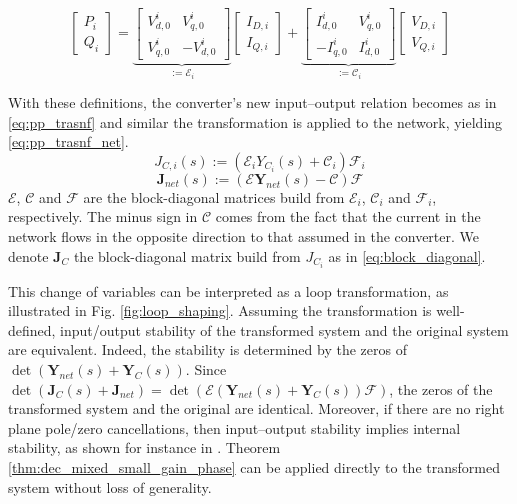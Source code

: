 \begin{equation}
    \begin{bmatrix}
        P_i \\ Q_i
    \end{bmatrix} = \underbrace{\begin{bmatrix}
        V^i_{d,0} & V^i_{q,0}  \\
        V^i_{q,0} & -V^i_{d,0}
    \end{bmatrix}}_{:=\mathcal{E}_i} \begin{bmatrix}
        I_{D,i} \\ I_{Q,i} 
    \end{bmatrix} + 
    \underbrace{\begin{bmatrix}
        I^i_{d,0} & V^i_{q,0}  \\
        -I^i_{q,0} & I^i_{d,0}
    \end{bmatrix}}_{:=\mathcal{C}_i}
    \begin{bmatrix}
        V_{D,i} \\ V_{Q,i} 
    \end{bmatrix}
    \label{eq:change_of_coord_2}
\end{equation}

With these definitions, the converter’s new input–output relation becomes as in \eqref{eq:pp_trasnf} and similar the transformation is applied to the network, yielding \eqref{eq:pp_trasnf_net}.
\begin{equation}
    J_{C,i}(s) :=(\mathcal{E}_iY_{C_i}(s)+\mathcal{C}_i)\mathcal{F}_i
    \label{eq:pp_trasnf}
\end{equation}
\begin{equation}
    \mathbf{J}_{net}(s) :=(\boldsymbol{\mathcal{E}}\mathbf{Y}_{net}(s)-\boldsymbol{\mathcal{C}})\boldsymbol{\mathcal{F}}
    \label{eq:pp_trasnf_net}
\end{equation}
$\boldsymbol{\mathcal{E}}$, $\boldsymbol{\mathcal{C}}$ and $\boldsymbol{\mathcal{F}}$ are the block-diagonal matrices build from $\mathcal{E}_i$, $\mathcal{C}_i$ and $\mathcal{F}_i$, respectively. The minus sign in $\mathcal{C}$ comes from the fact that the current in the network flows in the opposite direction to that assumed in the converter. We denote $\mathbf{J}_C$ the block-diagonal matrix build from $J_{C_i}$ as in \eqref{eq:block_diagonal}.

This change of variables can be interpreted as a loop transformation, as illustrated in Fig. \ref{fig:loop_shaping}. 
Assuming the transformation is well-defined, input/output stability of the transformed system and the original system are equivalent. Indeed, the stability is determined by the zeros of $\det(\mathbf{Y}_{net}(s)+\mathbf{Y}_C(s))$. Since $\det(\mathbf{J}_C(s) +\mathbf{J}_{net}) = \det(\boldsymbol{\mathcal{E}}(\mathbf{Y}_{net}(s)+\mathbf{Y}_{C}(s))\boldsymbol{\mathcal{F}})$, the zeros of the transformed system and the original are identical. Moreover, if there are no right plane pole/zero cancellations, then
 input–output stability implies internal stability, as shown for instance in \cite{häberle2025decentralizedparametricstabilitycertificates}. Theorem \ref{thm:dec_mixed_small_gain_phase} can be applied directly to the transformed system without loss of generality.

